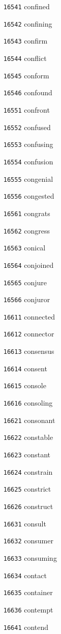 \documentclass[twoside,11pt]{article}
\begin{document}
\begin{multicols}{5}
\begin{enumerate}
\item[\texttt{16541}] confined
\item[\texttt{16542}] confining
\item[\texttt{16543}] confirm
\item[\texttt{16544}] conflict
\item[\texttt{16545}] conform
\item[\texttt{16546}] confound
\item[\texttt{16551}] confront
\item[\texttt{16552}] confused
\item[\texttt{16553}] confusing
\item[\texttt{16554}] confusion
\item[\texttt{16555}] congenial
\item[\texttt{16556}] congested
\item[\texttt{16561}] congrats
\item[\texttt{16562}] congress
\item[\texttt{16563}] conical
\item[\texttt{16564}] conjoined
\item[\texttt{16565}] conjure
\item[\texttt{16566}] conjuror
\item[\texttt{16611}] connected
\item[\texttt{16612}] connector
\item[\texttt{16613}] consensus
\item[\texttt{16614}] consent
\item[\texttt{16615}] console
\item[\texttt{16616}] consoling
\item[\texttt{16621}] consonant
\item[\texttt{16622}] constable
\item[\texttt{16623}] constant
\item[\texttt{16624}] constrain
\item[\texttt{16625}] constrict
\item[\texttt{16626}] construct
\item[\texttt{16631}] consult
\item[\texttt{16632}] consumer
\item[\texttt{16633}] consuming
\item[\texttt{16634}] contact
\item[\texttt{16635}] container
\item[\texttt{16636}] contempt
\item[\texttt{16641}] contend

\end{enumerate}
\end{multicols}
\end{document}
